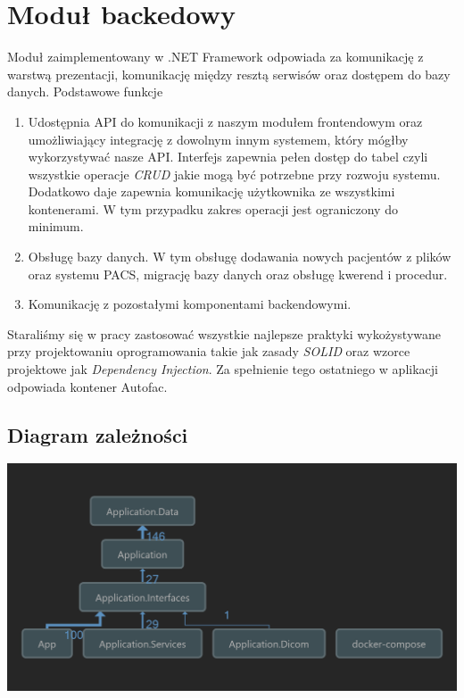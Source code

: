 \documentclass[a4paper,11pt,twoside]{report}
\theoremstyle{definition}
\begin{document}
\section{Moduł backedowy}

Moduł zaimplementowany w .NET Framework odpowiada za komunikację z warstwą prezentacji, komunikację między resztą serwisów oraz dostępem do bazy danych. Podstawowe funkcje
\begin{enumerate}
\item Udostępnia API do komunikacji z naszym modułem frontendowym oraz umożliwiający integrację z dowolnym innym systemem, który mógłby wykorzystywać nasze API. Interfejs zapewnia pełen dostęp do tabel czyli wszystkie operacje \textit{CRUD} jakie mogą być potrzebne przy rozwoju systemu. Dodatkowo daje zapewnia komunikację użytkownika ze wszystkimi kontenerami. W tym przypadku zakres operacji jest ograniczony do minimum.
\item Obsługę bazy danych. W tym obsługę dodawania nowych pacjentów z plików oraz systemu PACS, migrację bazy danych oraz obsługę kwerend i procedur.
\item Komunikację z pozostałymi komponentami backendowymi.
\end{enumerate}

Staraliśmy się w pracy zastosować wszystkie najlepsze praktyki wykożystywane przy projektowaniu oprogramowania takie jak zasady \textit{SOLID} oraz wzorce projektowe jak \textit{Dependency Injection}. Za spełnienie tego ostatniego w aplikacji odpowiada kontener Autofac.

\subsection{Diagram zależności}
\begin{minipage}{\linewidth}
	\centering
	\includegraphics[width=\textwidth]{Backend/ApplicationDependencies.png}
\end{minipage}
\end{document}
